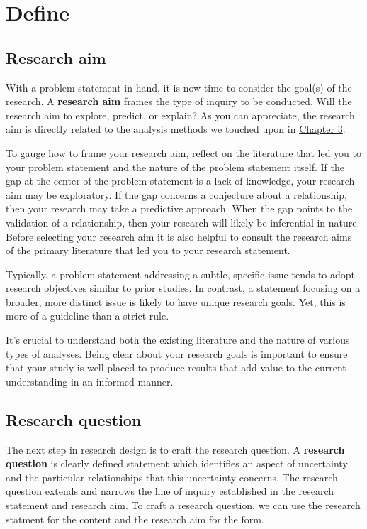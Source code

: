 \documentclass[
  letterpaper,
]{book}
\theoremstyle{definition}
\theoremstyle{remark}
\begin{document}
\section{Define}\label{sec-research-define}

\subsection{Research aim}\label{sec-research-aim}

With a problem statement in hand, it is now time to consider the goal(s)
of the research. A \textbf{research aim} frames the type of inquiry to
be conducted. Will the research aim to explore, predict, or explain? As
you can appreciate, the research aim is directly related to the analysis
methods we touched upon in \hyperref[sec-approaching-analysis]{Chapter
3}.

To gauge how to frame your research aim, reflect on the literature that
led you to your problem statement and the nature of the problem
statement itself. If the gap at the center of the problem statement is a
lack of knowledge, your research aim may be exploratory. If the gap
concerns a conjecture about a relationship, then your research may take
a predictive approach. When the gap points to the validation of a
relationship, then your research will likely be inferential in nature.
Before selecting your research aim it is also helpful to consult the
research aims of the primary literature that led you to your research
statement.

Typically, a problem statement addressing a subtle, specific issue tends
to adopt research objectives similar to prior studies. In contrast, a
statement focusing on a broader, more distinct issue is likely to have
unique research goals. Yet, this is more of a guideline than a strict
rule.

It's crucial to understand both the existing literature and the nature
of various types of analyses. Being clear about your research goals is
important to ensure that your study is well-placed to produce results
that add value to the current understanding in an informed manner.

\subsection{Research question}\label{sec-research-question}

The next step in research design is to craft the research question. A
\textbf{research question} is clearly defined
statement which identifies an aspect of uncertainty and the particular
relationships that this uncertainty concerns. The research question
extends and narrows the line of inquiry established in the research
statement and research aim. To craft a research question, we can use the
research statment for the content and the research aim for the form.
\end{document}
